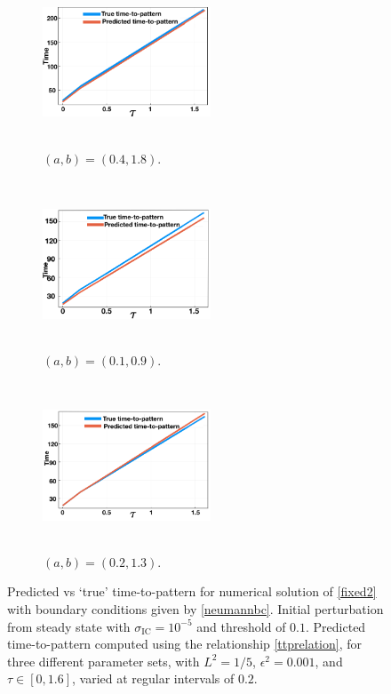 \begin{figure}[H]
    \centering
    \begin{subfigure}[t]{0.32\textwidth}
        \centering
        \includegraphics[width=5cm,height=5cm]{ttp1.png}
        \caption{$(a,b)=(0.4,1.8)$.}
        \label{fig:ttp1}
    \end{subfigure}
    \hfill
    \begin{subfigure}[t]{0.32\textwidth}
        \centering
        \includegraphics[width=5cm,height=5cm]{ttp2.png}
        \caption{$(a,b)=(0.1,0.9)$.}
        \label{fig:ttp2}
    \end{subfigure}
    \hfill
    \begin{subfigure}[t]{0.32\textwidth}
        \centering
        \includegraphics[width=5cm,height=5cm]{ttp3.png}
        \caption{$(a,b)=(0.2,1.3)$.}
        \label{fig:ttp3}
    \end{subfigure}
    \caption{Predicted vs `true' time-to-pattern for numerical solution of \eqref{fixed2} with boundary conditions given by \eqref{neumannbc}. Initial perturbation from steady state with $\sigma_{\text{IC}}= 10^{-5}$ and threshold of $0.1$. Predicted time-to-pattern computed using the relationship \eqref{ttprelation}, for three different parameter sets, with $L^2=1/5$, $\epsilon^2=0.001$, and $\tau\in[0,1.6]$, varied at regular intervals of $0.2$.}
    \label{}
\end{figure}

